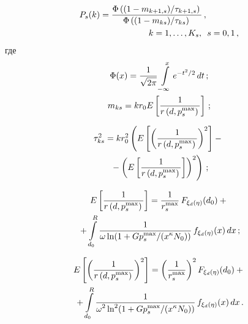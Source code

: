 \begin{figure*} %
 \vspace*{1pt}
\begin{center}
\mbox{%
\epsfxsize=107.234mm
}
\end{center}
\vspace*{-11pt}
\end{figure*}


\begin{multicols}{2}

\noindent
\begin{align*}
  P_s(k) &= \fr{\Phi\left( (1-m_{k+1,s})/\tau_{k+1,s}\right)}{\Phi\left((1-
m_{ks})/\tau_{ks}\right)}\,,\\
& \hspace*{20mm}k=1,\ldots, K_s,\enskip s=0,1\,,
  \end{align*}
где
\begin{gather*}
\Phi(x) =\displaystyle\frac{\displaystyle 1\mathstrut}{\displaystyle \sqrt{2\pi}\mathstrut}\int\limits^x_{-\infty} e^{-t^2/2}\,dt\,;\\
m_{ks} =  kr_0E \left[ \displaystyle\frac{\displaystyle 1\mathstrut}{\displaystyle r\left(d,p_s^{\max}\right)\mathstrut}\right]\,;
\end{gather*}

\vspace*{-12pt}

\noindent
\begin{multline*}
\tau^2_{ks}=kr_0^2\left( E\left[ \left( 
\displaystyle\frac{\displaystyle 1\mathstrut}{\displaystyle r\left( d,p_s^{\max}\right)\mathstrut}\right)^2\right]- {}\right.\\
\left.{}-
\left( E\left[ \displaystyle\frac{\displaystyle 1\mathstrut}{\displaystyle r\left(d, p_s^{\max}\right)\mathstrut}\right]\right)^2\right)\,;
\end{multline*}

\vspace*{-12pt}

\noindent
\begin{multline*}
E\left[ \displaystyle\frac{\displaystyle 1\mathstrut}{\displaystyle r\left( d,p_s^{\max}\right)\mathstrut}\right] = \displaystyle\frac{\displaystyle 1\mathstrut}{\displaystyle r_s^{\max}\mathstrut}\, 
F_{\xi_d(\eta)} (d_0) +{}\\
{}+
\int\limits_{d_0}^R \displaystyle\frac{\displaystyle 1\mathstrut}{\displaystyle \omega \ln (1+Gp_s^{\max}/ 
(x^\kappa N_0))\mathstrut}\, f_{\xi_d(\eta)} (x)\,dx\,;
\end{multline*}

\vspace*{-14pt}

\noindent
\begin{multline*}
E\left[ \left(\displaystyle\frac{\displaystyle 1\mathstrut}{\displaystyle r\left( d,p_s^{\max}\right)\mathstrut}\right)^2\right] = \left( \displaystyle\frac{\displaystyle 1\mathstrut}{\displaystyle r_s^{\max}\mathstrut}\right)^2 F_{\xi_d(\eta)}(d_0) + {}\\
{}+\int\limits^R_{d_0} \displaystyle\frac{\displaystyle 1\mathstrut}{\displaystyle \omega^2 
\ln^2 (1+Gp_s^{\max}/(x^\kappa N_0))\mathstrut}\,f_{\xi_d(\eta)} (x)\,dx\,.
\end{multline*}


\end{multicols}
